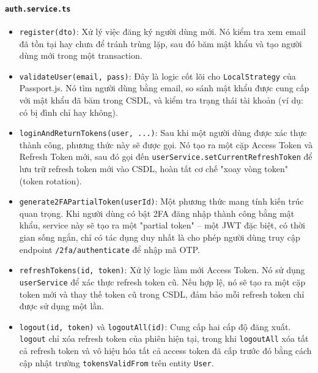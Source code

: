 \paragraph{\texttt{auth.service.ts}}
\begin{itemize}
    \item \texttt{register(dto)}: Xử lý việc đăng ký người dùng mới. Nó kiểm tra xem email đã tồn tại hay chưa để tránh trùng lặp, sau đó băm mật khẩu và tạo người dùng mới trong một transaction.
    
    \item \texttt{validateUser(email, pass)}: Đây là logic cốt lõi cho \texttt{LocalStrategy} của Passport.js. Nó tìm người dùng bằng email, so sánh mật khẩu được cung cấp với mật khẩu đã băm trong CSDL, và kiểm tra trạng thái tài khoản (ví dụ: có bị đình chỉ hay không).
    
    \item \texttt{loginAndReturnTokens(user, ...)}: Sau khi một người dùng được xác thực thành công, phương thức này sẽ được gọi. Nó tạo ra một cặp Access Token và Refresh Token mới, sau đó gọi đến \texttt{userService.setCurrentRefreshToken} để lưu trữ refresh token mới vào CSDL, hoàn tất cơ chế "xoay vòng token" (token rotation).
    
    \item \texttt{generate2FAPartialToken(userId)}: Một phương thức mang tính kiến trúc quan trọng. Khi người dùng có bật 2FA đăng nhập thành công bằng mật khẩu, service này sẽ tạo ra một "partial token" – một JWT đặc biệt, có thời gian sống ngắn, chỉ có tác dụng duy nhất là cho phép người dùng truy cập endpoint \texttt{/2fa/authenticate} để nhập mã OTP.
    
    \item \texttt{refreshTokens(id, token)}: Xử lý logic làm mới Access Token. Nó sử dụng \texttt{userService} để xác thực refresh token cũ. Nếu hợp lệ, nó sẽ tạo ra một cặp token mới và thay thế token cũ trong CSDL, đảm bảo mỗi refresh token chỉ được sử dụng một lần.
    
    \item \texttt{logout(id, token)} và \texttt{logoutAll(id)}: Cung cấp hai cấp độ đăng xuất. \texttt{logout} chỉ xóa refresh token của phiên hiện tại, trong khi \texttt{logoutAll} xóa tất cả refresh token và vô hiệu hóa tất cả access token đã cấp trước đó bằng cách cập nhật trường \texttt{tokensValidFrom} trên entity \texttt{User}.
\end{itemize}

